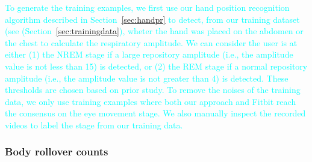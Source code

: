 \textcolor{cyan}{ To generate the training examples, we first use our hand position recognition algorithm described in
Section~\ref{sec:handpr} to detect, from our training dataset (see (Section~\ref{sec:trainingdata}), wheter the hand was placed on the
abdomen or the chest to calculate the respiratory amplitude. We can consider the user is at either (1) the NREM stage if a large repository
amplitude (i.e., the amplitude value is not less than 15) is detected, or (2) the REM stage if a normal repository amplitude (i.e., the
amplitude value is not greater than 4) is detected. These thresholds are chosen based on prior study\FIXME{ \cite{}}. To remove the noises
of the training data, we only use training examples where both our approach and Fitbit reach the consensus on the eye movement stage. We
also manually inspect the recorded videos to label the stage from our training data.}



%


\subsubsection{Body rollover counts \label{sec:bodyrollover}}

